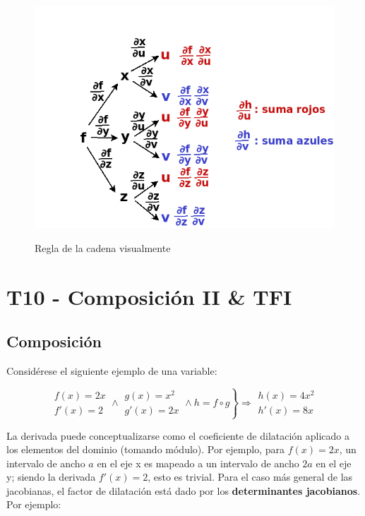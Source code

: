\documentclass{article}
\begin{document}
\begin{figure}[h]
\caption{Regla de la cadena visualmente}
\includegraphics[scale=.5]{img/teo_fig008_rc2.png} 
\centering
\label{fig:rc2}
\end{figure}

\section{T10 - Composición II \& TFI}

\subsection{Composición}

Considérese el siguiente ejemplo de una variable:

\begin{equation}
\left.
\begin{array}{ll}
f(x) = 2x \\
f'(x) = 2
\end{array}
\wedge
\begin{array}{ll}
g(x) = x^2 \\
g'(x) = 2x
\end{array}
\wedge
h = f \circ g
\right\} \Rightarrow
\begin{array}{ll}
h(x) = 4x^2 \\
h'(x) = 8x
\end{array}
\end{equation}

La derivada puede conceptualizarse como el coeficiente de dilatación aplicado a los elementos del dominio (tomando módulo).
Por ejemplo, para $f(x) = 2x$, un intervalo de ancho $a$ en el eje x es mapeado a un intervalo de ancho $2a$ en el eje y; siendo la derivada $f'(x)=2$, esto es trivial. Para el caso más general de las jacobianas, el factor de dilatación está dado por los \textbf{determinantes jacobianos}. Por ejemplo:
\end{document}
